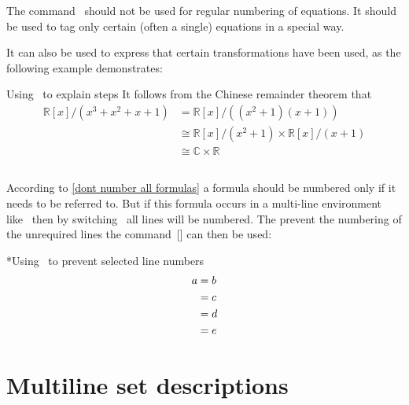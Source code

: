 The command~ should not be used for regular numbering of equations.
It should be used to tag only certain (often a single) equations in a special way.

It can also be used to express that certain transformations have been used, as the following example demonstrates:
\begin{showlatex}{Using~ to explain steps}
It follows from the Chinese remainder theorem that
\begin{align*}
  \mathbb{R}[x] / ( x^3 + x^2 + x + 1 )
  &=
  \mathbb{R}[x] / ( (x^2 + 1) (x + 1) )
  \\
  &\cong
  \mathbb{R}[x] / ( x^2 + 1 ) \times \mathbb{R}[x] / ( x + 1 )
  \tag{CRT}
  \\
  &\cong
  \mathbb{C} \times \mathbb{R}
\end{align*}
\end{showlatex}



\subsection{}

According to \cref{dont number all formulas} a formula should be numbered only if it needs to be referred to.
But if this formula occurs in a multi-line environment like~ then by switching~ all lines will be numbered.
The prevent the numbering of the unrequired lines the command~[\comname] can then be used:
\begin{showlatex}*{Using~ to prevent selected line numbers}
\begin{align}
  a
  &= b \notag \\
  &= c \\
  &= d \notag \\
  &= e
\end{align}
\end{showlatex}





\section{Multiline set descriptions}

